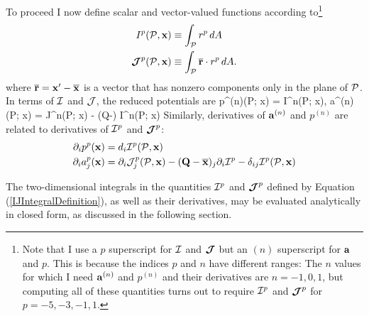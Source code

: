 \documentclass[letterpaper]{article}
\begin{document}
To proceed I now define scalar and vector-valued functions according 
to\footnote{Note that I use a $p$ superscript for $\mathcal{I}$ and $\boldsymbol{\mathcal{J}}$
but an $(n)$ superscript for $\mathbf{a}$ and $p$. This is because the 
indices $p$ and $n$ have different ranges: The $n$ values for which I 
need $\mathbf{a}^{(n)}$ and $p^{(n)}$ and their derivatives are 
$n={-1,0,1}$, but computing all of these quantities turns out to 
require $\mathcal{I}^p$ and $\boldsymbol{\mathcal{J}}^p$ for $p={-5,-3,-1,1}.$}
\begin{subequations}
\begin{align}
 I^p(\mathcal{P}, \mathbf{x}) &\equiv 
 \int_{\mathcal{P}} r^p \, dA
\\
\boldsymbol{\mathcal{J}}^p(\mathcal{P}, \mathbf{x})
 &\equiv \int_{\mathcal{P}} \overline{\mathbf{r}} \cdot  r^p \, dA.
\label{IJIntegralDefinition}
\end{align}
\end{subequations}
where $\overline{\mathbf{r}}=\mathbf{x}^\prime-\overline{\mathbf{x}}$ 
is a vector that has nonzero components only in the plane of $\mathcal{P}$.
In terms of $\mathcal{I}$ and $\mathcal{J}$, the reduced potentials are
{
  p^{(n)}(\mc P; \vb x) = \mc I^n(\mc P; \vb x),
   \qquad
   \vb a^{(n)}(\mc P; \vb x) =
   \bmc J^n(\mc P; \vb x)
      - \big(\vb Q-\big) \mc I^n(\mc P; \vb x)
}
Similarly, derivatives of $\mathbf{a}^{(n)}$ and $p^{(n)}$ are related to 
derivatives of $\mathcal{I}^p$ and $\boldsymbol{\mathcal{J}}^p$:
\begin{align*}
 \partial_i p^p (\mathbf{x}) &= d_i \mathcal{I}^p(\mathcal{P}, \mathbf{x}) 
\\
 \partial_i a^p_j (\mathbf{x})
&= \partial_i \mathcal{J}_j^p(\mathcal{P}, \mathbf{x})
  -(\mathbf{Q} - \overline{\mathbf{x}})_j \partial_i \mathcal{I}^p
  -\delta_{ij} \mathcal{I}^p(\mathcal{P}, \mathbf{x})
\end{align*}

The two-dimensional integrals in the quantities $\mathcal{I}^p$
and $\boldsymbol{\mathcal{J}}^p$ defined by Equation (\ref{IJIntegralDefinition}),
as well as their derivatives, may be evaluated analytically in 
closed form, as discussed in the following section.
\end{document}
